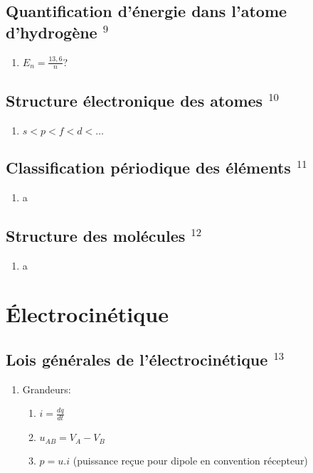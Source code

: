 \documentclass[fleqn]{article}
\theoremstyle{definition} \newtheorem*{defi}{D\'efinition}
\theoremstyle{definition} \newtheorem*{theo}{Th\'eor\`eme}
\theoremstyle{definition} \newtheorem*{coro}{Corollaire}
\theoremstyle{remark} \newtheorem*{rqs}{Remarques}
\theoremstyle{definition} \newtheorem*{prop}{Propri\'et\'e}
\begin{document}
\subsection{Quantification d'\'energie dans l'atome d'hydrog\`ene $^9$}
\begin{enumerate}
	\item $E_n = \frac{13,6}{n}$?
\end{enumerate}

\subsection{Structure \'electronique des atomes $^{10}$}
\begin{enumerate}
	\item $s < p < f < d < \hdots $
\end{enumerate}

\subsection{Classification p\'eriodique des \'el\'ements $^{11}$}
\begin{enumerate}
	\item a
\end{enumerate}

\subsection{Structure des mol\'ecules $^{12}$}
\begin{enumerate}
	\item a
\end{enumerate}



\newpage

\section{\'Electrocin\'etique}
\subsection{Lois g\'en\'erales de l'\'electrocin\'etique $^{13}$}
\begin{enumerate}
	\item Grandeurs:
		\begin{enumerate}
			\item $i = \frac{dq}{dt}$
			\item $u_{AB} = V_A - V_B$
			\item $p = u.i$ (puissance re\c{c}ue pour dipole en convention r\'ecepteur)
		\end{enumerate}
\end{enumerate}
\end{document}
